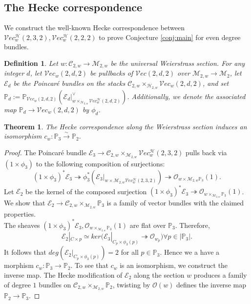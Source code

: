 \documentclass[11pt]{amsart}
\newtheorem{theorem}{Theorem}
\newtheorem{definition}{Definition}[section]
\numberwithin{theorem}{section}
\numberwithin{lemma}{section}
\theoremstyle{definition}
\newcommand{\p}{\mathbb{P}}
\newcommand{\ri}{\rightarrow}
\newcommand{\mo}{\mathcal{O}}
\newcommand{\m}{\mathcal{M}}
\newcommand{\h}{\mathcal{H}}
\newcommand{\ve}{\mathcal{V}ec}
\newcommand{\e}{\mathcal{E}}
\newcommand{\mC}{\mathcal{C}}
\newcommand{\ty}{\mathcal{T}}
\begin{document}
\subsection{The Hecke correspondence}\label{sec:hecke}
We construct the well-known Hecke correspondence between $\ve_w^\h(2,3,2),\ve_w^\h(2,2,2)$ to prove Conjecture \ref{conj:main} for even degree bundles.
\begin{definition}\label{def:pu}
	Let $w:\mathcal{C}_{2,w}\ri \mathcal{M}_{2,w}$ be the universal Weierstrass section. For any integer $d$, let $\ve_w(2,d,2)$ be pullbacks of $\ve(2,d,2)$ over $\mathcal{M}_{2,w}\ri\mathcal{M}_2$, 
	let $\e_d$ be the Poincar\'e bundles on the stacks $\mathcal{C}_{2,w}\times_{\mathcal{H}_{2,w}} \ve_w(2,d,2)$, and set $\p_{d}:=\p_{\ve_w(2,d,2)}(\e_d|^\vee_{w\times_{\mathcal{H}_{2,w}} \ve_w^\h(2,d,2)})$. 
Additionally, we denote the associated map $\p_{d}\ri \ve_w(2,d,2)$ by $\phi_d$.
\end{definition}
\begin{theorem}\label{thm:cu}
The Hecke correspondence along the Weierstrass section induces an isomorphism $c_w:\p_{3}\xrightarrow{\sim} \p_{2}$.
\end{theorem}
\begin{proof}
	The Poincar\'e bundle $\e_3\ri \mathcal{C}_{2,w}\times_{\mathcal{M}_{2,w}} \ve_w^\h(2,3,2)$ pulls back via $(1\times \phi_3)$ to the following composition of surjections:
	$$(1\times \phi_3)^*\e_3\twoheadrightarrow \phi_3^*(\e_3|_{w\times{\mathcal{M}_{2,w}} \ve_w^\h(2,3,2)})\twoheadrightarrow \mo_{w\times{\mathcal{M}_{2,w}}\p_3}(1).$$
Let $\e_2$ be the kernel of the composed surjection $(1\times \phi_3)^*\e_3\twoheadrightarrow\mo_{w\times_{\mathcal{M}_{2,w}}\p_3}(1)$. We show that $\e_2\ri \mathcal{C}_{2,w}\times_{\mathcal{M}_{2,w}} \p_3$ is a family of vector bundles with the claimed properties.\\
The sheaves $(1\times \phi_3)^*\e_3,\mo_{w\times_{\mathcal{M}_{2,w}} \p_3}(1)$ are flat over $\p_3$. Therefore, 
$$\e_2|_{C\times p}\simeq ker(\e_3|_{C_p\times \phi_3(p)}\twoheadrightarrow \mo_{w_p}) \forall p\in |\p_3|.$$
It follows that $deg(\e_2|_{C_p\times \phi_3(p)})=2 $ for all $p\in \p_3$. Hence we a have a morphism $c_w:\p_3\ri \p_2$.
To see that $c_w$ is an isomorphism, we construct the inverse map. The Hecke modification of $\e_2$ along the section $w$ produces a family of degree $1$ bundles on $\mC_{2,w}\times_{\m_{2,w}}\p_2$, twisting by $\mo(w)$ defines the inverse map $\p_2\ri \p_3$.
\end{proof}
\end{document}
